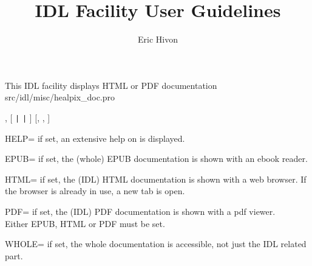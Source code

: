 


\sloppy



\title{\healpix IDL Facility User Guidelines}
 \section[healpix\_doc: PDF, HTML and EPUB documentation]{ }
\label{idl:healpix_doc}
\author{Eric Hivon}




\begin{facility}
{This IDL facility displays HTML or PDF \healpix documentation}
{src/idl/misc/healpix\_doc.pro}
\end{facility}

\begin{IDLformat}
{\thedocid, [%
 {\tt |} %
 {\tt |} %
] [, %
,  %
] }
\end{IDLformat}

\begin{keywords}
  \begin{kwlist}{} %
    \item[HELP\mytarget{idl:healpix_doc:HELP}=] if set, an extensive help on \thedocid{} is displayed.
    \item[EPUB\mytarget{idl:healpix_doc:EPUB}=] if set, the (whole) \healpix EPUB documentation is shown with an ebook reader.
    \item[HTML\mytarget{idl:healpix_doc:HTML}=] if set, the \healpix (IDL) HTML documentation is shown with a web browser.
            If the browser is already in use, a new tab is open.
    \item[PDF\mytarget{idl:healpix_doc:PDF}=]   if set, the \healpix (IDL) PDF documentation is shown with a pdf viewer.\\
            Either EPUB, HTML or PDF must be set.
    \item[WHOLE\mytarget{idl:healpix_doc:WHOLE}=]  if set, the whole \healpix documentation is accessible,
              not just the IDL related part.
  \end{kwlist}
\end{keywords}  

